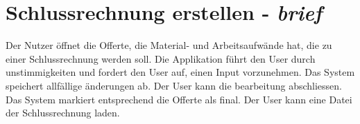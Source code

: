 \documentclass[journal]{combine}
\begin{document}
	\section{Schlussrechnung erstellen - \emph{brief}}
		Der Nutzer öffnet die Offerte, die Material- und Arbeitsaufwände hat,
		die zu einer Schlussrechnung werden soll. Die Applikation führt den User durch
		unstimmigkeiten und fordert den User auf, einen Input vorzunehmen. Das System
		speichert allfällige änderungen ab. Der User kann die bearbeitung abschliessen.
		Das System markiert entsprechend die Offerte als final. Der User kann eine Datei der 
		Schlussrechnung laden.
\end{document}
